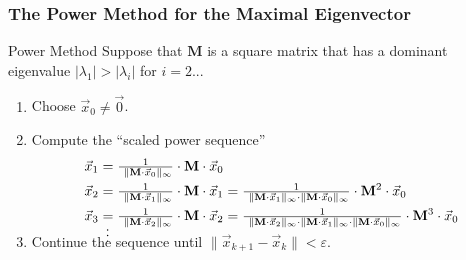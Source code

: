 \documentclass[10pt,handout,hyperref={colorlinks=true,linkcolor=blue,citecolor=citelink,urlcolor=gray}]{beamer}
\newcounter{e_temp}
\begin{document}
\begin{frame}[label=PowerMethod]
\frametitle{The Power Method for the Maximal Eigenvector}
\begin{block}{Power Method\footnotemark}
Suppose that $\mathbf{M}$ is a square matrix that has a dominant eigenvalue $|\lambda_1| > |\lambda_i|$ for $i=2...$

\begin{enumerate}
\item Choose $\vec{x}_0 \ne \vec{0}$. 
\item Compute the ``scaled power sequence''
	\vspace{-2ex}
	\begin{align*}\footnotesize
		\vec{x}_1 &= \tfrac{1}{\ \|\mathbf{M}\cdot\vec{x}_0\|_\infty}\cdot \mathbf{M}\cdot\vec{x}_0 \\
		\vec{x}_2 &= \tfrac{1}{\ \|\mathbf{M}\cdot\vec{x}_1\|_\infty}\cdot \mathbf{M}\cdot\vec{x}_1 
			= \tfrac{1}{\ \|\mathbf{M}\cdot\vec{x}_1\|_\infty\cdot \|\mathbf{M}\cdot\vec{x}_0\|_\infty}\cdot \mathbf{M}^2\cdot\vec{x}_0 \\
		\vec{x}_3 &= \tfrac{1}{\ \|\mathbf{M}\cdot\vec{x}_2\|_\infty}\cdot \mathbf{M}\cdot\vec{x}_2 
			= \tfrac{1}{\ \|\mathbf{M}\cdot\vec{x}_2\|_\infty\cdot \|\mathbf{M}\cdot\vec{x}_1\|_\infty\cdot \|\mathbf{M}\cdot\vec{x}_0\|_\infty}\cdot \mathbf{M}^3\cdot\vec{x}_0 \\[-2ex]
			&\ \,\vdots \\[-5ex]
	\end{align*}
\item Continue the sequence until $\|\vec{x}_{k+1} - \vec{x}_k\| <\varepsilon$.
\end{enumerate}
\end{block}
\end{frame}
\end{document}
